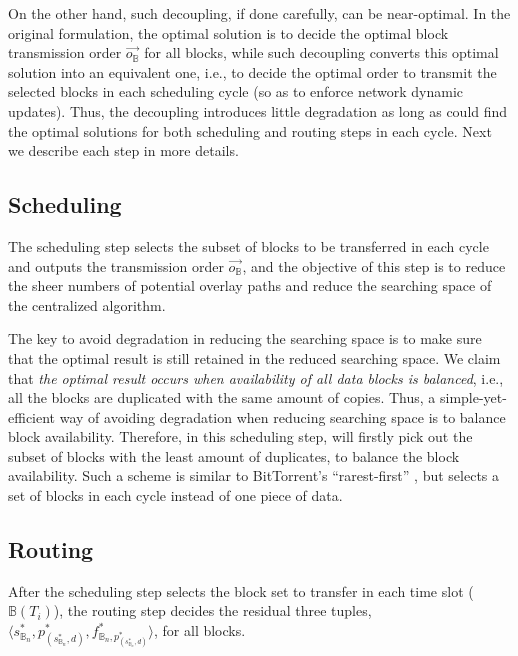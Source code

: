 On the other hand, such decoupling, if done carefully, can be near-optimal. In the original formulation, the optimal solution is to decide the optimal block transmission order $\overrightarrow{o_\mathbb{B}}$ for all blocks, while such decoupling converts this optimal solution into an equivalent one, i.e., to decide the optimal order to transmit the selected blocks in each scheduling cycle (so as to enforce network dynamic updates). Thus, the decoupling introduces little degradation as long as \name could find the optimal solutions for both scheduling and routing steps in each cycle. Next we describe each step in more details.


\subsection{Scheduling}
\label{subsec:logic:scheduling}

The scheduling step
selects the subset of blocks to be transferred in each cycle and
outputs the transmission order $\overrightarrow{o_\mathbb{B}}$, and the objective of this step is to reduce the sheer numbers of potential overlay paths and reduce the searching space of the centralized algorithm.


The key to avoid degradation in reducing the searching space is to make sure that the optimal result is still retained in the reduced searching space. We claim that {\em the optimal result occurs when availability of all data blocks is balanced}, i.e., all the blocks are duplicated with the same amount of copies. Thus, a simple-yet-efficient way of avoiding degradation when reducing searching space is to balance block availability. Therefore, in this scheduling step, \name will firstly pick out the subset of blocks with the least amount of duplicates, to balance the block availability. Such a scheme is similar to BitTorrent's ``rarest-first'' \cite{Cohen2003Incentives}, but \name selects a set of blocks in each cycle instead of one piece of data.


\subsection{Routing}
\label{subsec:logic:routing}

After the scheduling step selects the block set to transfer in each time slot ($\mathbb{B}(T_i)$), the routing step decides the residual three tuples, $\langle s_{\mathbb{B}_n}^*, p^*_{(s^*_{\mathbb{B}_n},d)}, f^*_{\mathbb{B}_n,p^*_{(s^*_{\mathbb{B}_n},d)}} \rangle$, for all blocks.

